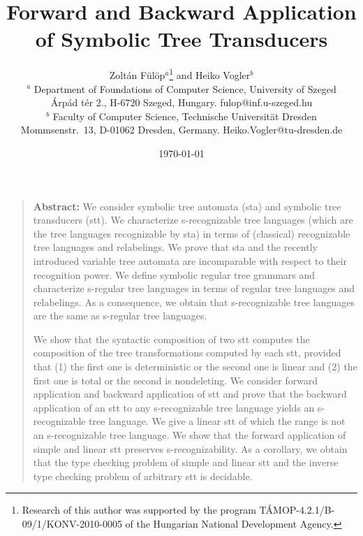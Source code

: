 \documentclass[10pt]{scrartcl}
\begin{document}
\title{Forward and Backward Application of Symbolic Tree Transducers}

\author{Zolt\'an F\"ul\"op$^a$\thanks{Research of this author was supported by the program T\'AMOP-4.2.1/B-09/1/KONV-2010-0005  of the Hungarian National
    Development Agency.} and Heiko Vogler$^b$\\
  {\small $^a$ Department of Foundations of Computer Science,
    University of Szeged} \\[-.5ex]
  {\small \'Arp\'ad t\'er 2., H-6720 Szeged, Hungary.
    {fulop@inf.u-szeged.hu}} \smallskip \\
  {\small $^b$ Faculty of Computer Science, Technische Universit\"at
    Dresden} \\[-.5ex]
  {\small Mommsenstr.~13, D-01062 Dresden, Germany.
    {Heiko.Vogler@tu-dresden.de}}}

\date{\today}

\maketitle

\sloppy


\begin{quote}{\bf Abstract:} We consider symbolic tree automata (sta) and symbolic tree transducers (stt). We characterize s-recognizable tree languages (which are the tree languages recognizable by sta) in terms of (classical) recognizable tree languages and relabelings. We prove that sta and the recently introduced variable tree automata are incomparable with respect to their recognition power.  We define symbolic regular tree grammars and characterize s-regular tree languages in terms of regular tree languages and relabelings. As a consequence, we obtain that s-recognizable tree languages are the same as s-regular tree languages.

We show that  the syntactic composition of two stt computes the composition of
the tree transformations computed by each stt, provided that (1) the first one is deterministic or the second one is linear and (2) the first one is total or the second is nondeleting.  We consider forward application and backward application of stt and prove  that the backward application of an stt to any s-recognizable tree language yields an s-recognizable tree language. We give a linear stt of which the range is not an s-recognizable tree language. We show that the  forward application of simple and linear stt preserves s-recognizability. As a corollary, we obtain  that the type checking problem of simple and linear stt and the inverse type checking problem of arbitrary stt is decidable.
\end{quote}
\end{document}
